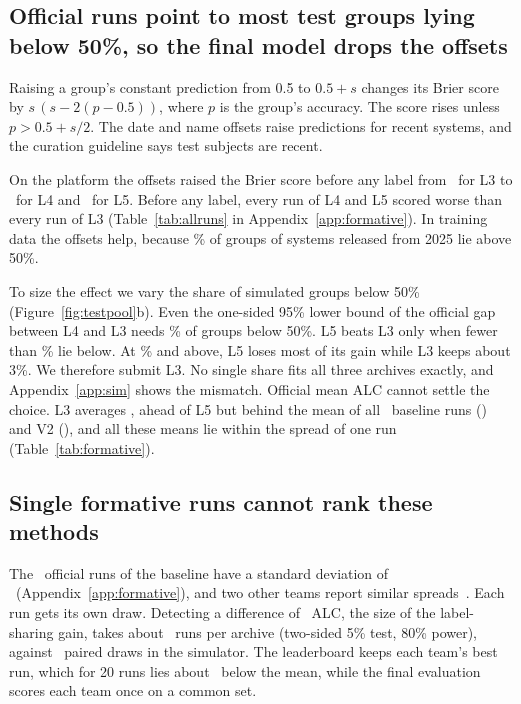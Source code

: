 \documentclass{article}
\begin{document}
\subsection{Official runs point to most test groups lying below 50\%, so the final model drops the offsets}
\label{sec:res-side}
Raising a group's constant prediction from 0.5 to $0.5+s$ changes its Brier score by $s\,(s-2(p-0.5))$, where $p$ is the group's accuracy.
The score rises unless $p>0.5+s/2$.
The date and name offsets raise predictions for recent systems, and the curation guideline says test subjects are recent.

On the platform the offsets raised the Brier score before any label from \RSideBzeroLthree\ for L3 to \RSideBzeroLfour\ for L4 and \RSideBzeroLfive\ for L5. Before any label, every run of L4 and L5 scored worse than every run of L3 (Table~\ref{tab:allruns} in Appendix~\ref{app:formative}).
In training data the offsets help, because \SideTrainAbovePct\% of groups of systems released from 2025 lie above 50\%.

To size the effect we vary the share of simulated groups below 50\% (Figure~\ref{fig:testpool}b).
Even the one-sided 95\% lower bound of the official gap between L4 and L3 needs \ShortPiLow\% of groups below 50\%.
L5 beats L3 only when fewer than \ShortBreakeven\% lie below.
At \ShortPiLow\% and above, L5 loses most of its gain while L3 keeps about 3\%.
We therefore submit L3.
No single share fits all three archives exactly, and Appendix~\ref{app:sim} shows the mismatch.
Official mean ALC cannot settle the choice. L3 averages \ROffLthreeMean, ahead of L5 but behind the mean of all \OffBetaAllN\ baseline runs (\ROffBetaAllMean) and V2 (\ROffVtwoMean), and all these means lie within the spread of one run (Table~\ref{tab:formative}).

\subsection{Single formative runs cannot rank these methods}
\label{sec:res-formative}
The \OffBetaAllN\ official runs of the baseline have a standard deviation of \ROffBetaAllSd\ (Appendix~\ref{app:formative}), and two other teams report similar spreads~\citep{veseluhha,shashwat}.
Each run gets its own draw. Detecting a difference of \QConfFullAbs\ ALC, the size of the label-sharing gain, takes about \RunsNeededOurs\ runs per archive (two-sided 5\% test, 80\% power), against \RunsNeededPaired\ paired draws in the simulator.
The leaderboard keeps each team's best run, which for 20 runs lies about \BestOfTwentyShift\ below the mean, while the final evaluation scores each team once on a common set.
\end{document}
